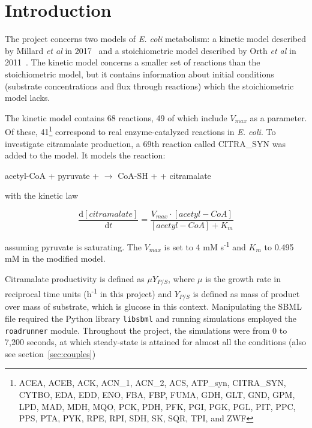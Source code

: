 \documentclass[parskip=full]{scrreprt}
\begin{document}
\chapter*{Introduction}
\label{ch:intro}

The project concerns two models of \emph{E. coli} metabolism: a kinetic model described by Millard \emph{et al} in 2017~\cite{millard_metabolic_2017} and a stoichiometric model described by Orth \emph{et al} in 2011~\cite{orth_comprehensive_2011}. The kinetic model concerns a smaller set of reactions than the stoichiometric model, but it contains information about initial conditions (substrate concentrations and flux through reactions) which the stoichiometric model lacks.

The kinetic model contains 68 reactions, 49 of which include $V_{max}$ as a parameter. Of these, 41\footnote{ACEA, ACEB, ACK, ACN\_1, ACN\_2, ACS, ATP\_syn, CITRA\_SYN, CYTBO, EDA, EDD, ENO, FBA, FBP, FUMA, GDH, GLT, GND, GPM, LPD, MAD, MDH, MQO, PCK, PDH, PFK, PGI, PGK, PGL, PIT, PPC, PPS, PTA, PYK, RPE, RPI, SDH, SK, SQR, TPI, and ZWF} correspond to real enzyme-catalyzed reactions in \emph{E. coli}. To investigate citramalate production, a 69th reaction called CITRA\_SYN was added to the model. It models the reaction:

\begin{center}
  acetyl-CoA + pyruvate +  $\rightarrow$ CoA-SH +  + citramalate
\end{center}

with the kinetic law

\[
  \frac{\mathrm{d}[citramalate]}{\mathrm{d}t} = 
  \frac{V_{max} \cdot [acetyl-CoA]}{[acetyl-CoA] + K_{m}}
\]

assuming pyruvate is saturating. The $V_{max}$ is set to 4 mM s\textsuperscript{-1} and $K_{m}$ to 0.495 mM in the modified model.

Citramalate productivity is defined as $\mu Y_{P/S}$, where $\mu$ is the growth rate in reciprocal time units (h\textsuperscript{-1} in this project) and $Y_{P/S}$ is defined as mass of product over mass of substrate, which is glucose in this context. Manipulating the SBML file required the Python library \texttt{libsbml} and running simulations employed the \texttt{roadrunner} module. Throughout the project, the simulations were from 0 to 7,200 seconds, at which steady-state is attained for almost all the conditions (also see section~\vref{sec:couples}) %
\end{document}
